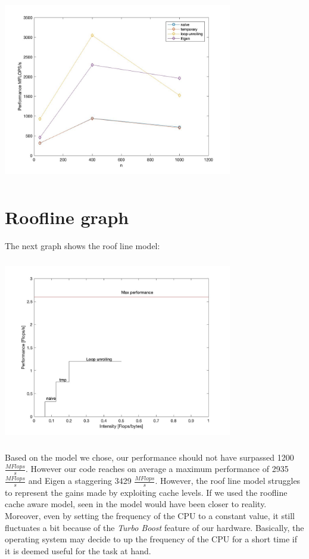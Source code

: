 \documentclass[11pt,a4paper,oneside,titlepage,openright]{book}
\begin{document}
\begin{center}
\includegraphics[width=10cm, height=8cm]{plotcolor}
\end{center}
\newpage
\section{Roofline graph}
The next graph shows the roof line model:
\begin{center}
\includegraphics[width=10cm, height=8cm]{fig_ok}
\end{center}
Based on the model we chose, our performance should not have surpassed 1200$\frac{MFlops}{s}$. However our code reaches on average a maximum performance of 2935 $\frac{MFlops}{s}$ and Eigen a staggering 3429 $\frac{MFlops}{s}$. 
However, the roof line model struggles to represent the gains made by exploiting cache levels. If we used the roofline cache aware model, seen in \cite{roofmdelcache} the model would have been closer to reality. 
Moreover, even by setting the frequency of the CPU to a constant value, it still fluctuates a bit because of the \textit{Turbo Boost} feature of our hardware. 
Basically, the operating system may decide to up the frequency of the CPU for a short time if it is deemed useful for the task at hand.
\newpage
\end{document}
